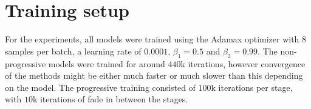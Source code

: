 \section{Training setup}
For the experiments, all models were trained using the Adamax optimizer \parencite{kingma2014adam} with $8$ samples per batch, a learning rate of $0.0001$, $\beta_1 = 0.5$ and $\beta_2 = 0.99$. The non-progressive models were trained for around $440$k iterations, however convergence of the methods might be either much faster or much slower than this depending on the model. The progressive training consisted of $100$k iterations per stage, with $10$k iterations of fade in between the stages. 

